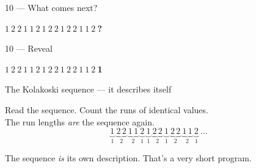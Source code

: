 \documentclass[aspectratio=169, 12pt, xcolor={dvipsnames}]{beamer}
\newcommand{\seqtight}[1]{{\Large\ttfamily #1}}
\newcommand{\blank}{\textcolor{accent}{\textbf{?}}}
\newcommand{\ans}[1]{\textcolor{accent}{\textbf{#1}}}
\newcommand{\hintline}[1]{\vfill\begin{center}\small\textcolor{hint}{#1}\end{center}}
\begin{document}
\begin{frame}{10 --- What comes next?}
\vfill
\begin{center}\seqtight{$1\ 2\ 2\ 1\ 1\ 2\ 1\ 2\ 2\ 1\ 2\ 2\ 1\ 1\ 2\ $\blank}\end{center}
\vfill
\end{frame}

\begin{frame}{10 --- Reveal}
\vfill
\begin{center}\seqtight{$1\ 2\ 2\ 1\ 1\ 2\ 1\ 2\ 2\ 1\ 2\ 2\ 1\ 1\ 2\ $\ans{1}}\end{center}
\vfill
\begin{center}\Large The Kolakoski sequence --- it describes itself\end{center}
\vspace{0.3em}
\begin{center}\small
Read the sequence. Count the runs of identical values.\\
The run lengths \emph{are} the sequence again.
\[
\underbrace{1}_{1}\ \underbrace{2\,2}_{2}\ \underbrace{1\,1}_{2}\ \underbrace{2}_{1}\ \underbrace{1}_{1}\ \underbrace{2\,2}_{2}\ \underbrace{1}_{1}\ \underbrace{2\,2}_{2}\ \underbrace{1\,1}_{2}\ \underbrace{2}_{1}\ \dots
\]
\end{center}
\hintline{The sequence \emph{is} its own description. That's a very short program.}
\end{frame}
\end{document}
